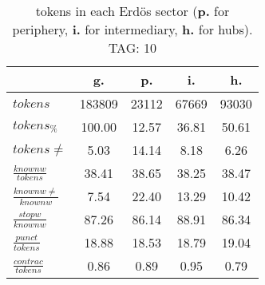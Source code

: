 \begin{table}[h!]
\begin{center}
\begin{tabular}{| l || c | c | c | c |}\hline
 & {\bf g.} & {\bf p.} & {\bf i.} & {\bf h.} \\\hline\hline
$tokens$ & 183809  & 23112  & 67669  & 93030 \\
$tokens_{\%}$ & 100.00  & 12.57  & 36.81  & 50.61 \\
$tokens \neq$ & 5.03  & 14.14  & 8.18  & 6.26 \\\hline
$\frac{knownw}{tokens}$ & 38.41  & 38.65  & 38.25  & 38.47 \\
$\frac{knownw \neq}{knownw}$ & 7.54  & 22.40  & 13.29  & 10.42 \\\hline
$\frac{stopw}{knownw}$ & 87.26  & 86.14  & 88.91  & 86.34 \\
$\frac{punct}{tokens}$ & 18.88  & 18.53  & 18.79  & 19.04 \\
$\frac{contrac}{tokens}$ & 0.86  & 0.89  & 0.95  & 0.79 \\\hline
\end{tabular}
\caption{tokens in each Erd\"os sector ({{\bf p.}} for periphery, {{\bf i.}} for intermediary, 
    {{\bf h.}} for hubs). TAG: 10}
\end{center}
\end{table}